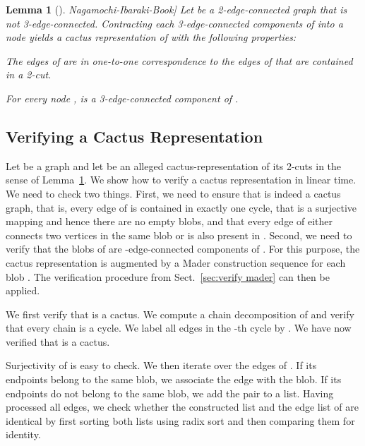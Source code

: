 \documentclass[paper=a4]{scrartcl}
\newtheorem{lemma}{Lemma}
\begin{document}
\newcommand{\citeNaga}{\cite[Section 2.3.5]{Nagamochi-Ibaraki-Book}}

\begin{lemma}[\citeNaga] \label{cactus representation} Let  be a 2-edge-connected graph that is not 3-edge-connected. Contracting each 3-edge-connected components of  into a node yields a cactus representation  of  with the following properties:
\begin{compactenum}[i)]
\item The edges of  are in one-to-one correspondence to the edges of  that are contained in a 2-cut.
\item For every node ,  is a 3-edge-connected component of .
\end{compactenum}
\end{lemma}





\subsection{Verifying a Cactus Representation}

Let  be a graph and let  be an alleged cactus-representation of its 2-cuts in the sense of Lemma~\ref{cactus representation}. We show how to verify a cactus representation in linear time. We need to check two things. First, we need to ensure that  is indeed a cactus graph, that is, every edge of  is contained in exactly one cycle, that  is a surjective mapping and hence there are no empty blobs, and that every edge of  either connects two vertices in the same blob or is also present in . Second, we need to verify that the blobs of  are -edge-connected components of . For this purpose, the cactus representation is augmented by a Mader construction sequence for each blob . The verification procedure from Sect.~\ref{sec:verify mader} can then be applied.

We first verify that  is a cactus. We compute a chain decomposition of  and verify that every chain is a cycle. We label all edges in the -th cycle by . We have now verified that  is a cactus.

Surjectivity of  is easy to check. We then iterate over the edges  of . If its endpoints belong to the same blob, we associate the edge with the blob. If its endpoints do not belong to the same blob, we add the pair  to a list. Having processed all edges, we check whether the constructed list and the edge list of  are identical by first sorting both lists using radix sort and then comparing them for identity.
\end{document}
